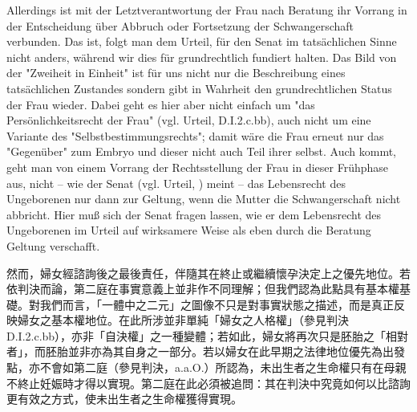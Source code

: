 \documentclass[12pt]{article}
\begin{document}
\begin{sourcepara}[title={原文SondervotumMS.280}]
Allerdings ist mit der Letztverantwortung der Frau nach Beratung ihr Vorrang in der Entscheidung über Abbruch oder Fortsetzung der Schwangerschaft verbunden. Das ist, folgt man dem Urteil, für den Senat im tatsächlichen Sinne nicht anders, während wir dies für grundrechtlich fundiert halten. Das Bild von der "Zweiheit in Einheit" ist für uns nicht nur die Beschreibung eines tatsächlichen Zustandes sondern gibt in Wahrheit den grundrechtlichen Status der Frau wieder. Dabei geht es hier aber nicht einfach um "das Persönlichkeitsrecht der Frau" (vgl. Urteil, D.I.2.c.bb), auch nicht um eine Variante des "Selbstbestimmungsrechts"; damit wäre die Frau erneut nur das "Gegenüber" zum Embryo und dieser nicht auch Teil ihrer selbst. Auch kommt, geht man von einem Vorrang der Rechtsstellung der Frau in dieser Frühphase aus, nicht -- wie der Senat (vgl. Urteil, \abbrAAO{}) meint -- das Lebensrecht des Ungeborenen nur dann zur Geltung, wenn die Mutter die Schwangerschaft nicht abbricht. Hier muß sich der Senat fragen lassen, wie er dem Lebensrecht des Ungeborenen im Urteil auf wirksamere Weise als eben durch die Beratung Geltung verschafft.
\end{sourcepara}
\begin{transpara}
然而，婦女經諮詢後之最後責任，伴隨其在終止或繼續懷孕決定上之優先地位。若依判決而論，第二庭在事實意義上並非作不同理解；但我們認為此點具有基本權基礎。對我們而言，「一體中之二元」之圖像不只是對事實狀態之描述，而是真正反映婦女之基本權地位。在此所涉並非單純「婦女之人格權」（參見判決 D.I.2.c.bb），亦非「自決權」之一種變體；若如此，婦女將再次只是胚胎之「相對者」，而胚胎並非亦為其自身之一部分。若以婦女在此早期之法律地位優先為出發點，亦不會如第二庭（參見判決，a.a.O.）所認為，未出生者之生命權只有在母親不終止妊娠時才得以實現。第二庭在此必須被追問：其在判決中究竟如何以比諮詢更有效之方式，使未出生者之生命權獲得實現。
\end{transpara}
\end{document}
